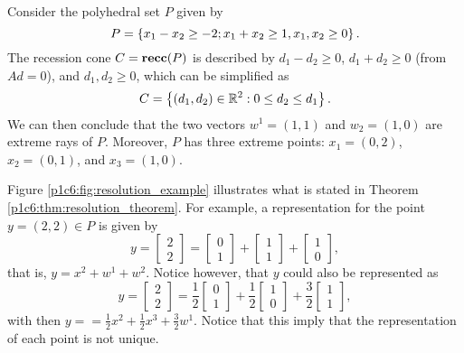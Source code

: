 Consider the polyhedral set $P$ given by
%
\begin{equation*}
	P = \left\{ x_1 - x_2 \geq -2; x_1 + x_2 \geq 1, x_1,x_2 \geq 0 \right \}.
\end{equation*}
%
The recession cone $C = {\bf recc}(P)$ is described by $d_1 - d_2 \geq 0$, $d_1 + d_2 \geq 0$ (from $Ad =0$), and $d_1, d_2 \geq 0$, which can be simplified as 
%
\begin{equation*}
	C = \left\{ (d_1, d_2) \in \mathbb{R}^2 : 0 \leq d_2 \leq d_1 \right \}.
\end{equation*}
%
We can then conclude that the two vectors $w^1 = (1,1)$ and $w_2 = (1,0)$ are extreme rays of $P$. Moreover, $P$ has three extreme points: $x_1 = (0,2)$, $x_2 = (0,1)$, and $x_3 = (1,0)$.

Figure \ref{p1c6:fig:resolution_example} illustrates what is stated in Theorem \ref{p1c6:thm:resolution_theorem}. For example,  a representation for the point $y = (2,2) \in P$ is given by
%
\begin{equation*}
	y = \begin{bmatrix} 2 \\ 2
		\end{bmatrix}= \begin{bmatrix} 0 \\ 1
		\end{bmatrix} + \begin{bmatrix} 1 \\ 1
		\end{bmatrix} + \begin{bmatrix} 1 \\ 0
		\end{bmatrix}, 	
\end{equation*}
%
that is, $y = x^2 + w^1 + w^2$. Notice however, that $y$ could also be represented as 
%
\begin{equation*}
	y = \begin{bmatrix} 2 \\ 2
		\end{bmatrix}= \frac{1}{2}\begin{bmatrix} 0 \\ 1
		\end{bmatrix} + \frac{1}{2}\begin{bmatrix} 1 \\ 0
		\end{bmatrix} + \frac{3}{2}\begin{bmatrix} 1 \\ 1
		\end{bmatrix}, 	
\end{equation*}
%
with then $y = = \frac{1}{2}x^2 + \frac{1}{2}x^3 + \frac{3}{2}w^1$. Notice that this imply that the representation of each point is not unique.

